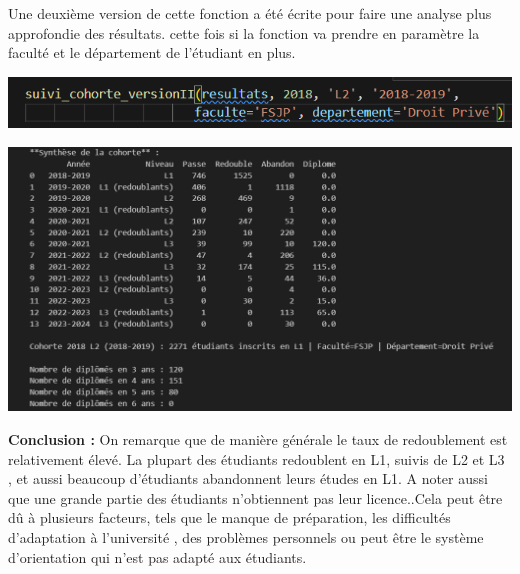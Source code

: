 Une deuxième version de cette fonction a été écrite pour faire une analyse plus approfondie des résultats. cette fois si la fonction va prendre en paramètre la faculté et le département de l'étudiant en plus.
\begin{center}
    \includegraphics[width=1\textwidth]{image/12.png} 
\end{center} 
\begin{center}
    \includegraphics[width=1\textwidth]{image/13.png} 
\end{center} 
\textcolor{red}{\faInfoCircle}\textbf{Conclusion :} 
On remarque que de manière générale le taux de redoublement est relativement élevé. La plupart des étudiants redoublent en L1, suivis de L2 et L3 , et aussi beaucoup d'étudiants abandonnent leurs études en L1.
A noter aussi que une grande partie des étudiants n'obtiennent pas leur licence..Cela peut être dû à plusieurs facteurs, tels que le manque de préparation, les difficultés d'adaptation à l'université , des problèmes personnels ou peut être le système d'orientation qui n'est pas adapté aux étudiants. 

